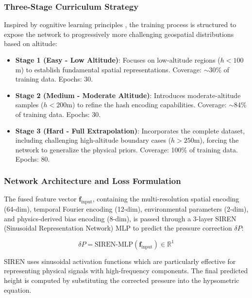 \subsubsection{Three-Stage Curriculum Strategy}
Inspired by cognitive learning principles \cite{bengio2009curriculum}, the training process is structured to expose the network to progressively more challenging geospatial distributions based on altitude:

\begin{itemize}
    \item \textbf{Stage 1 (Easy - Low Altitude)}: Focuses on low-altitude regions ($h < 100$m) to establish fundamental spatial representations. 
    Coverage: $\sim$30\% of training data.
    Epochs: 30.
    
    \item \textbf{Stage 2 (Medium - Moderate Altitude)}: Introduces moderate-altitude samples ($h < 200$m) to refine the hash encoding capabilities.
    Coverage: $\sim$84\% of training data.
    Epochs: 30.
    
    \item \textbf{Stage 3 (Hard - Full Extrapolation)}: Incorporates the complete dataset, including challenging high-altitude boundary cases ($h > 250$m), forcing the network to generalize the physical priors. 
    Coverage: 100\% of training data.
    Epochs: 80.
\end{itemize}

\subsubsection{Network Architecture and Loss Formulation}
The fused feature vector $\mathbf{f}_{\text{input}}$, containing the multi-resolution spatial encoding (64-dim), temporal Fourier encoding (12-dim), environmental parameters (2-dim), and physics-derived bias encoding (8-dim), is passed through a 3-layer SIREN (Sinusoidal Representation Network) MLP to predict the pressure correction $\delta P$:

\begin{equation}
\delta P = \text{SIREN-MLP}(\mathbf{f}_{\text{input}}) \in \mathbb{R}^1
\label{eq:mlp_output}
\end{equation}

SIREN uses sinusoidal activation functions which are particularly effective for representing physical signals with high-frequency components. The final predicted height is computed by substituting the corrected pressure into the hypsometric equation.

